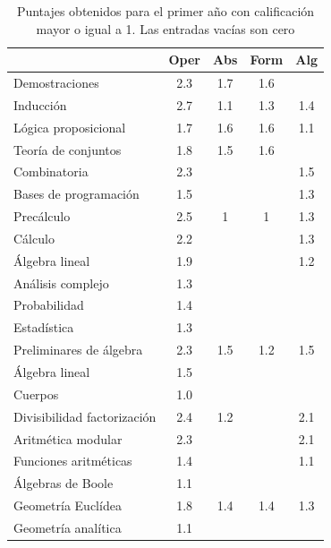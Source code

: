 \begin{refsection}
\begin{table}[H]
\begin{center}
\begin{tabular}{|l|c|c|c|c|}
\hline
\rowcolor[HTML]{00C0F3} 
\multicolumn{1}{|c|}{\cellcolor[HTML]{00C0F3} \textbf{Contenidos}} & \textbf{Oper} & \textbf{Abs} & \textbf{Form} & \textbf{Alg} \\ \hline
Demostraciones & 2.3 & 1.7 & 1.6 &  \\ \hline
Inducción & 2.7 & 1.1 & 1.3 & 1.4 \\ \hline
Lógica proposicional & 1.7 & 1.6 & 1.6 & 1.1 \\ \hline
Teoría de conjuntos & 1.8 & 1.5 & 1.6 &  \\ \hline
Combinatoria & 2.3 &  &  & 1.5 \\ \hline
Bases de programación & 1.5 &  &  & 1.3 \\ \hline
Precálculo & 2.5 & 1 & 1 & 1.3 \\ \hline
Cálculo & 2.2 &  &  & 1.3 \\ \hline
Álgebra lineal & 1.9 &  &  & 1.2 \\ \hline
Análisis complejo & 1.3 &  &  &  \\ \hline
Probabilidad & 1.4 &  &  &  \\ \hline
Estadística & 1.3 &  &  &  \\ \hline
Preliminares de álgebra & 2.3 & 1.5 & 1.2 & 1.5 \\ \hline
Álgebra lineal & 1.5 &  &  &  \\ \hline
Cuerpos & 1.0 &  &  &  \\ \hline
Divisibilidad factorización & 2.4 & 1.2 &  & 2.1 \\ \hline
Aritmética modular & 2.3 &  &  & 2.1 \\ \hline
Funciones aritméticas & 1.4 &  &  & 1.1 \\ \hline
Álgebras de Boole & 1.1 &  &  &  \\ \hline
Geometría Euclídea & 1.8 & 1.4 & 1.4 & 1.3 \\ \hline
Geometría analítica & 1.1 &  &  &  \\ \hline
\end{tabular}
\end{center}
\caption{Puntajes obtenidos para el primer año con calificación mayor o igual a 1. Las entradas vacías son cero}
\label{Primeranno}
\end{table}


\end{refsection}
